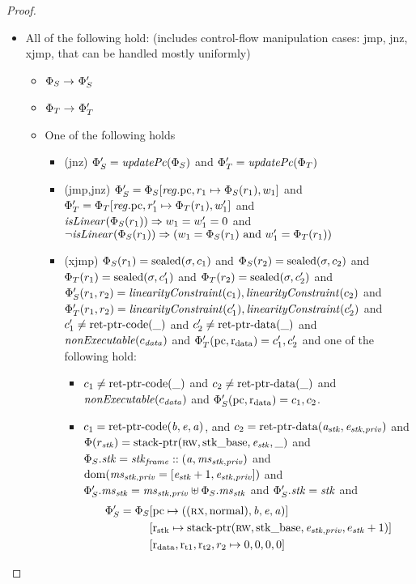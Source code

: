 \documentclass[a4paper]{article}
\begin{document}
\begin{proof}
\begin{itemize}
\item All of the following hold: (includes control-flow manipulation cases: jmp, jnz, xjmp, that can be handled mostly uniformly)
  \begin{itemize}
  \item $\Phi_S \rightarrow^{} \Phi_S'$
  \item $\Phi_T \rightarrow^{} \Phi_T'$
  \item One of the following holds
    \begin{itemize}
    \item(jnz) $\Phi_S' = \updPcAddr{\Phi_S}$ and $\Phi_T' = \updPcAddr{\Phi_T}$
    \item(jmp,jnz) $\Phi_S' = \Phi_S[\mathit{reg}.\mathrm{pc},r_1 \mapsto \Phi_S(r_1),w_1]$ and $\Phi_T' =
      \Phi_T[\mathit{reg}.\mathrm{pc},r_1' \mapsto \Phi_T(r_1),w_1']$ and 
      $\isLinear{\Phi_S(r_1)} \Rightarrow w_1 = w_1' = 0$ and
      $\neg \isLinear{\Phi_S(r_1)} \Rightarrow (w_1 = \Phi_S(r_1) \text{ and }
      w_1' = \Phi_T(r_1))$
    \item(xjmp) $\Phi_S(r_1) = \mathrm{sealed}(\sigma,c_1)$ and $\Phi_S(r_2) =
      \mathrm{sealed}(\sigma,c_2)$ and $\Phi_T(r_1) = \mathrm{sealed}(\sigma,c_1')$ and
      $\Phi_T(r_2) = \mathrm{sealed}(\sigma,c_2')$ and $\Phi_S'(r_1,r_2) =
      \linCons{c_1},\linCons{c_2}$ and $\Phi_T'(r_1,r_2) =
      \linCons{c_1'},\linCons{c_2'}$ and\\
      $c_1' \neq \mathrm{ret\text{-}ptr\text{-}code}(\_)$ and $c_2' \neq \mathrm{ret\text{-}ptr\text{-}data}(\_)$ and
        $\nonExec{c_\data}$ and $\Phi_T'(\mathrm{pc},\mathrm{r}_\mathrm{data}) = c_1',c_2'$ and
      one of the following hold:
      \begin{itemize}
      \item $c_1 \neq \mathrm{ret\text{-}ptr\text{-}code}(\_)$ and $c_2 \neq \mathrm{ret\text{-}ptr\text{-}data}(\_)$ and
        $\nonExec{c_\data}$ and $\Phi_S'(\mathrm{pc},\mathrm{r}_\mathrm{data}) = c_1,c_2$.
      \item $c_1 = \mathrm{ret\text{-}ptr\text{-}code}(\mathit{b},\mathit{e},\mathit{a})$, and $c_2 =
        \mathrm{ret\text{-}ptr\text{-}data}(\mathit{a}_{\mathit{stk}},\mathit{e}_{\mathit{stk},\mathit{priv}})$ and $\Phi(r_{\mathit{stk}}) =
        \mathrm{stack\text{-}ptr}(\textsc{rw},\mathrm{stk\_base},\mathit{e}_{\mathit{stk}},\_)$ and $\Phi_S.\mathit{stk} = \mathit{stk}_{\mathit{frame}}
        :: (\mathit{a},\mathit{ms}_{\mathit{stk},\mathit{priv}})$ and
        $\mathrm{dom}(\mathit{ms}_{\mathit{stk},\mathit{priv}} = [\mathit{e}_{\mathit{stk}}+1,\mathit{e}_{\mathit{stk},\mathit{priv}}])$ and
        $\Phi_S'.\mathit{ms}_{\mathit{stk}} = \mathit{ms}_{\mathit{stk},\mathit{priv}} \uplus \Phi_S.\mathit{ms}_{\mathit{stk}}$ and
        $\Phi_S'.\mathit{stk} = \mathit{stk}$ and
        \[
          \begin{split}
\Phi_S' = \Phi_S&[\mathrm{pc} \mapsto ((\textsc{rx},\mathrm{normal}),\mathit{b},\mathit{e},\mathit{a})]\\
            &[\mathrm{r}_\mathrm{stk} \mapsto
            \mathrm{stack\text{-}ptr}(\textsc{rw},\mathrm{stk\_base},\mathit{e}_{\mathit{stk},\mathit{priv}},e_{\mathit{stk}}+1)] \\
            &[\mathrm{r}_\mathrm{data},\mathrm{r}_\mathrm{t1},\mathrm{r}_\mathrm{t2},r_2 \mapsto 0, 0, 0, 0]
          \end{split}
        \]
      \end{itemize}
    \end{itemize}
  \end{itemize}
\end{itemize}


\end{proof}
\end{document}
